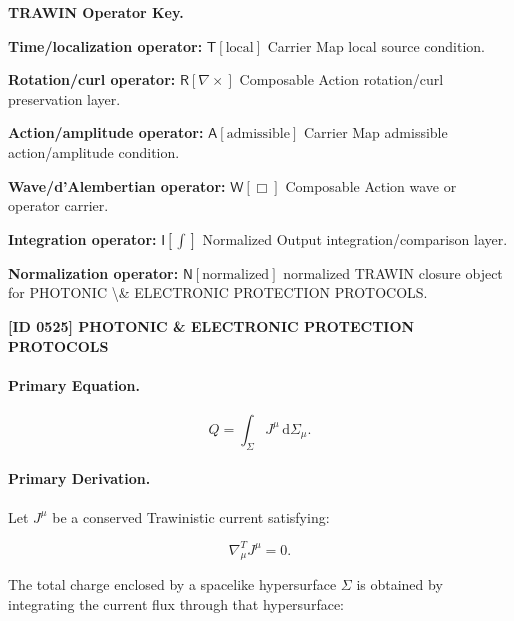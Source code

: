 \par\vspace{0.45\baselineskip}
\noindent\begin{minipage}[t]{\linewidth}
\begingroup
\small
\raggedright
\textbf{TRAWIN Operator Key.}\par
\noindent\textbf{Time/localization operator:} $\mathsf{T}\!\left[\mathrm{local}\right]$ Carrier Map local source condition.\par
\noindent\textbf{Rotation/curl operator:} $\mathsf{R}\!\left[\nabla\times\right]$ Composable Action rotation/curl preservation layer.\par
\noindent\textbf{Action/amplitude operator:} $\mathsf{A}\!\left[\mathrm{admissible}\right]$ Carrier Map admissible action/amplitude condition.\par
\noindent\textbf{Wave/d'Alembertian operator:} $\mathsf{W}\!\left[\Box\right]$ Composable Action wave or operator carrier.\par
\noindent\textbf{Integration operator:} $\mathsf{I}\!\left[\int\right]$ Normalized Output integration/comparison layer.\par
\noindent\textbf{Normalization operator:} $\mathsf{N}\!\left[\mathrm{normalized}\right]$ normalized TRAWIN closure object for PHOTONIC \textbackslash{}\& ELECTRONIC PROTECTION PROTOCOLS.\par
\endgroup
\end{minipage}

\clearpage
\noindent\textbf{[ID 0525] PHOTONIC \& ELECTRONIC PROTECTION PROTOCOLS}\par
\vspace{0.35em}
\paragraph{Primary Equation.}
\begin{equation}
Q
=
\int_{\Sigma}
J^\mu
\,\mathrm{d}\Sigma_\mu .
\end{equation}

\paragraph{Primary Derivation.}
Let $J^\mu$ be a conserved Trawinistic current satisfying:

\begin{equation}
\nabla^T_\mu J^\mu = 0 .
\end{equation}

The total charge enclosed by a spacelike hypersurface $\Sigma$ is obtained by integrating the current flux through that hypersurface:

